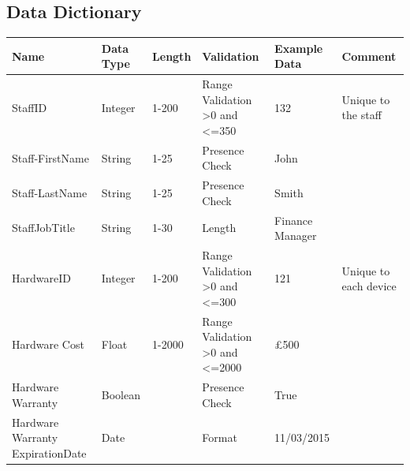 \subsection{Data Dictionary}

\begin{center}
\begin{longtable}{|p{2cm}|p{1.14cm}|p{1.1cm}|p{1.7cm}|p{1.7cm}|p{2cm}|}
\hline
\textbf{Name} & \textbf{Data Type}& \textbf{Length} & \textbf{Validation} & \textbf{Example Data} & \textbf{Comment}      \\ \hline
StaffID                             & Integer                                 & 1-200                     & Range Validation \textgreater0 and \textless=350                                 & 132                   & Unique to the staff   \\ \hline
Staff-FirstName                      & String                                  & 1-25                                 & Presence Check                           & John                  &                       \\ \hline
Staff-LastName                       & String                                  & 1-25                                 & Presence Check                           & Smith                 &                       \\ \hline
StaffJobTitle			& String				& 1-30			& Length			& Finance Manager		&		\\ \hline
HardwareID                          & Integer                                 & 1-200                                & Range Validation \textgreater0 and  \textless=300                      & 121                   & Unique to each device \\ \hline
Hardware Cost                       & Float                                 & 1-2000                             & Range Validation \textgreater0 and \textless=2000                                    & £500                  &                       \\ \hline
Hardware Warranty                    & Boolean                                 &                                      & Presence Check                           & True                  &                       \\ \hline
Hardware Warranty ExpirationDate              & Date                                  &                                & Format                                   & 11/03/2015               &                       \\ \hline

\end{longtable}
\end{center}
